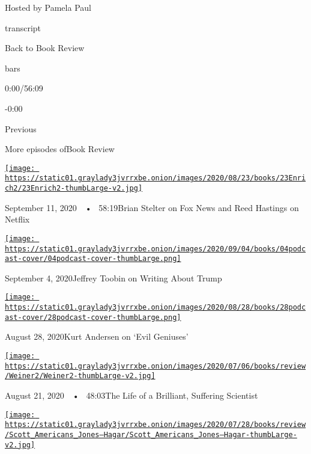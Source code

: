 Hosted by Pamela Paul

transcript

Back to Book Review

bars

0:00/56:09

-0:00

Previous

More episodes ofBook Review

\href{https://www.nytimes3xbfgragh.onion/2020/09/11/books/review/podcast-hoax-fox-news-donald-trump-brian-stelter-nextflix-reed-hastings.html?action=click\&module=audio-series-bar\&region=header\&pgtype=Article}{\texttt{[image: https://static01.graylady3jvrrxbe.onion/images/2020/08/23/books/23Enrich2/23Enrich2-thumbLarge-v2.jpg]}}

September 11, 2020~~•~ 58:19Brian Stelter on Fox News and Reed Hastings
on Netflix

\href{https://www.nytimes3xbfgragh.onion/2020/09/04/books/review/podcast-jeffrey-toobin-true-crimes-misdemeanors-trump-dayna-tortorici-elena-ferrante.html?action=click\&module=audio-series-bar\&region=header\&pgtype=Article}{\texttt{[image: https://static01.graylady3jvrrxbe.onion/images/2020/09/04/books/04podcast-cover/04podcast-cover-thumbLarge.png]}}

September 4, 2020Jeffrey Toobin on Writing About Trump

\href{https://www.nytimes3xbfgragh.onion/2020/08/28/books/review/podcast-evil-geniuses-kurt-andersen-fallout-hiroshima-lesley-m-m-blume.html?action=click\&module=audio-series-bar\&region=header\&pgtype=Article}{\texttt{[image: https://static01.graylady3jvrrxbe.onion/images/2020/08/28/books/28podcast-cover/28podcast-cover-thumbLarge.png]}}

August 28, 2020Kurt Andersen on `Evil Geniuses'

\href{https://www.nytimes3xbfgragh.onion/2020/08/21/books/review/podcast-Dominant-Character-Samanth-Subramanian-Book-of-Eels-Patrik-Svensson.html?action=click\&module=audio-series-bar\&region=header\&pgtype=Article}{\texttt{[image: https://static01.graylady3jvrrxbe.onion/images/2020/07/06/books/review/Weiner2/Weiner2-thumbLarge-v2.jpg]}}

August 21, 2020~~•~ 48:03The Life of a Brilliant, Suffering Scientist

\href{https://www.nytimes3xbfgragh.onion/2020/08/14/books/review/podcast-a-o-scott-edward-p-jones-eric-jay-dolin-furious-sky-hurricanes.html?action=click\&module=audio-series-bar\&region=header\&pgtype=Article}{\texttt{[image: https://static01.graylady3jvrrxbe.onion/images/2020/07/28/books/review/Scott\_Americans\_Jones--Hagar/Scott\_Americans\_Jones--Hagar-thumbLarge-v2.jpg]}}

